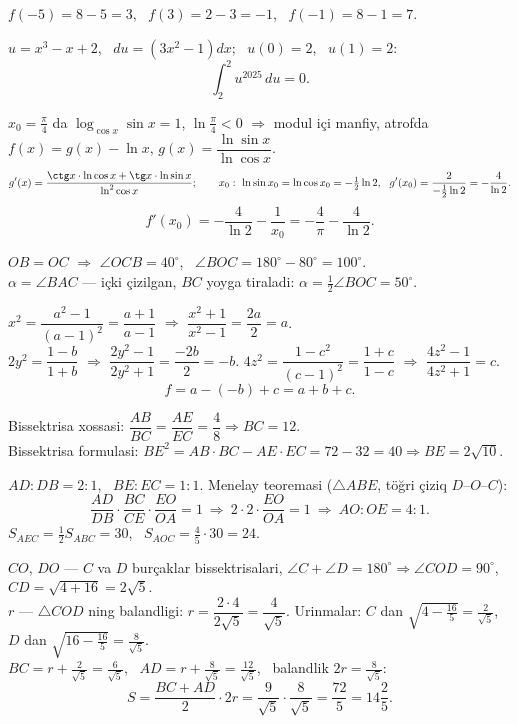 $f(-5)=8-5=3$, \ $f(3)=2-3=-1$, \ $f(-1)=8-1=7$.

$u=x^3-x+2$, \ $du=(3x^2-1)dx$; \ $u(0)=2$, \ $u(1)=2$:
\[\int_2^2u^{2025}\,du=0.\]

$x_0=\frac\pi4$ da $\log_{\cos x}\sin x=1$, $\ln\frac\pi4<0$ $\Rightarrow$ modul içi manfiy, atrofda $f(x)=g(x)-\ln x$, $g(x)=\dfrac{\ln\sin x}{\ln\cos x}$.
\[g'(x)=\frac{\ctg x\cdot\ln\cos x+\tg x\cdot\ln\sin x}{\ln^2\cos x};\qquad x_0:\ \ln\sin x_0=\ln\cos x_0=-\tfrac12\ln2,\ \ g'(x_0)=\frac{2}{-\frac12\ln2}=-\frac4{\ln2}.\]
\[f'(x_0)=-\frac4{\ln2}-\frac1{x_0}=-\frac4\pi-\frac4{\ln2}.\]

$OB=OC$ $\Rightarrow$ $\angle OCB=40^\circ$, \ $\angle BOC=180^\circ-80^\circ=100^\circ$.\\
$\alpha=\angle BAC$ — içki çizilgan, $BC$ yoyga tiraladi: $\alpha=\frac12\angle BOC=50^\circ$.

$x^2=\dfrac{a^2-1}{(a-1)^2}=\dfrac{a+1}{a-1}$ $\Rightarrow$ $\dfrac{x^2+1}{x^2-1}=\dfrac{2a}{2}=a$.\\
$2y^2=\dfrac{1-b}{1+b}$ $\Rightarrow$ $\dfrac{2y^2-1}{2y^2+1}=\dfrac{-2b}{2}=-b$. \quad $4z^2=\dfrac{1-c^2}{(c-1)^2}=\dfrac{1+c}{1-c}$ $\Rightarrow$ $\dfrac{4z^2-1}{4z^2+1}=c$.
\[f=a-(-b)+c=a+b+c.\]

Bissektrisa xossasi: $\dfrac{AB}{BC}=\dfrac{AE}{EC}=\dfrac48\Rightarrow BC=12$.\\
Bissektrisa formulasi: $BE^2=AB\cdot BC-AE\cdot EC=72-32=40\Rightarrow BE=2\sqrt{10}$.

$AD:DB=2:1$, \ $BE:EC=1:1$. Menelay teoremasi ($\triangle ABE$, töğri çiziq $D$–$O$–$C$):
\[\frac{AD}{DB}\cdot\frac{BC}{CE}\cdot\frac{EO}{OA}=1\ \Rightarrow\ 2\cdot2\cdot\frac{EO}{OA}=1\ \Rightarrow\ AO:OE=4:1.\]
$S_{AEC}=\frac12S_{ABC}=30$, \ $S_{AOC}=\frac45\cdot30=24$.

$CO$, $DO$ — $C$ va $D$ burçaklar bissektrisalari, $\angle C+\angle D=180^\circ\Rightarrow\angle COD=90^\circ$, \ $CD=\sqrt{4+16}=2\sqrt5$.\\
$r$ — $\triangle COD$ ning balandligi: $r=\dfrac{2\cdot4}{2\sqrt5}=\dfrac4{\sqrt5}$. Urinmalar: $C$ dan $\sqrt{4-\frac{16}5}=\frac2{\sqrt5}$, $D$ dan $\sqrt{16-\frac{16}5}=\frac8{\sqrt5}$.\\
$BC=r+\frac2{\sqrt5}=\frac6{\sqrt5}$, \ $AD=r+\frac8{\sqrt5}=\frac{12}{\sqrt5}$, \ balandlik $2r=\frac8{\sqrt5}$:
\[S=\frac{BC+AD}2\cdot2r=\frac9{\sqrt5}\cdot\frac8{\sqrt5}=\frac{72}5=14\frac25.\]

